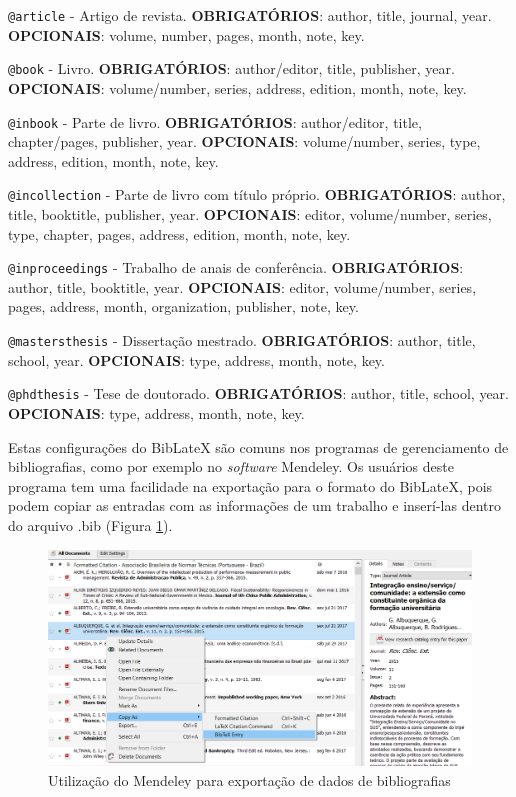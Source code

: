 \documentclass[12pt,brazil,]{book}
\begin{document}
\texttt{@article} - Artigo de revista. \textbf{OBRIGATÓRIOS}: author,
title, journal, year. \textbf{OPCIONAIS}: volume, number, pages, month,
note, key.

\texttt{@book} - Livro. \textbf{OBRIGATÓRIOS}: author/editor, title,
publisher, year. \textbf{OPCIONAIS}: volume/number, series, address,
edition, month, note, key.

\texttt{@inbook} - Parte de livro. \textbf{OBRIGATÓRIOS}: author/editor,
title, chapter/pages, publisher, year. \textbf{OPCIONAIS}:
volume/number, series, type, address, edition, month, note, key.

\texttt{@incollection} - Parte de livro com título próprio.
\textbf{OBRIGATÓRIOS}: author, title, booktitle, publisher, year.
\textbf{OPCIONAIS}: editor, volume/number, series, type, chapter, pages,
address, edition, month, note, key.

\texttt{@inproceedings} - Trabalho de anais de conferência.
\textbf{OBRIGATÓRIOS}: author, title, booktitle, year.
\textbf{OPCIONAIS}: editor, volume/number, series, pages, address,
month, organization, publisher, note, key.

\texttt{@mastersthesis} - Dissertação mestrado. \textbf{OBRIGATÓRIOS}:
author, title, school, year. \textbf{OPCIONAIS}: type, address, month,
note, key.

\texttt{@phdthesis} - Tese de doutorado. \textbf{OBRIGATÓRIOS}: author,
title, school, year. \textbf{OPCIONAIS}: type, address, month, note,
key.

Estas configurações do BibLateX são comuns nos programas de
gerenciamento de bibliografias, como por exemplo no \emph{software}
Mendeley. Os usuários deste programa tem uma facilidade na exportação
para o formato do BibLateX, pois podem copiar as entradas com as
informações de um trabalho e inserí-las dentro do arquivo .bib (Figura
\ref{fig:rmarkmendeley}).

\begin{figure}

{\centering \includegraphics[width=0.6\linewidth]{rmarkmendeley} 

}

\caption{Utilização do Mendeley para exportação de dados de bibliografias}\label{fig:rmarkmendeley}
\end{figure}
\end{document}
